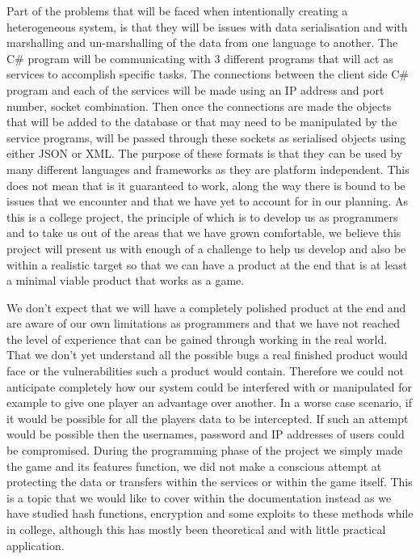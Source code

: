 Part of the problems that will be faced when intentionally creating a heterogeneous system, is that they will be issues with data serialisation and with marshalling and un-marshalling of the data from one language to another. The C# program will be communicating with 3 different programs that will act as services to accomplish specific tasks. The connections between the client side C# program and each of the services will be made using an IP address and port number, socket combination. Then once the connections are made the objects that will be added to the database or that may need to be manipulated by the service programs, will be passed through these sockets as serialised objects using either JSON or XML. The purpose of these formats is that they can be used by many different languages and frameworks as they are platform independent. This does not mean that is it guaranteed to work, along the way there is bound to be issues that we encounter and that we have yet to account for in our planning. As this is a college project, the principle of which is to develop us as programmers and to take us out of the areas that we have grown comfortable, we believe this project will present us with enough of a challenge to help us develop and also be within a realistic target so that we can have a product at the end that is at least a minimal viable product that works as a game. \newline

We don't expect that we will have a completely polished product at the end and are aware of our own limitations as programmers and that we have not reached the level of experience that can be gained through working in the real world. That we don't yet understand all the possible bugs a real finished product would face or the vulnerabilities such a product would contain. Therefore we could not anticipate completely how our system could be interfered with or manipulated for example to give one player an advantage over another. In a worse case scenario, if it would be possible for all the players data to be intercepted. If such an attempt would be possible then the usernames, password and IP addresses of users could be compromised. During the programming phase of the project we simply made the game and its features function, we did not make a conscious attempt at protecting the data or transfers within the services or within the game itself. This is a topic that we would like to cover within the documentation instead as we have studied hash functions, encryption and some exploits to these methods while in college, although this has mostly been theoretical and with little practical application.